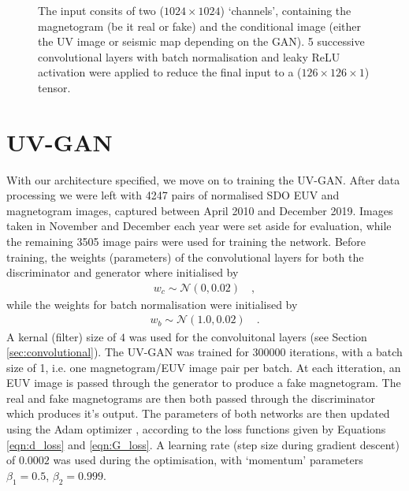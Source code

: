 \documentclass[11pt,a4paper,onecolumn]{report}
\begin{document}
\begin{figure}
  \centering
  \caption{
    The input consits of two ($1024\times 1024$) `channels', containing the
    magnetogram (be it real or fake) and the conditional image (either the UV
    image or seismic map depending on the GAN). 5 successive convolutional
    layers with batch normalisation and leaky ReLU activation were applied to
    reduce the final input to a ($126\times 126 \times 1$) tensor.
  }
  \label{fig:discrim_model}
\end{figure}



\section{UV-GAN}
With our architecture specified, we move on to training the UV-GAN. After data
processing we were left with 4247 pairs of normalised SDO EUV and magnetogram
images, captured between April 2010 and December 2019. Images taken in November
and December each year were set aside for evaluation, while the remaining 3505
image pairs were used for training the network. Before training, the weights
(parameters) of the convolutional layers for both the discriminator and
generator where initialised by
\begin{align}
  w_c \sim \mathcal{N}\left(0, 0.02\right) \quad ,
\end{align}
while the weights for batch normalisation were initialised by
\begin{align}
  w_b \sim \mathcal{N}\left(1.0, 0.02\right) \quad .
\end{align}
A kernal (filter) size of $4$ was used for the convoluitonal layers (see Section
\ref{sec:convolutional}). The UV-GAN was trained for $300000$ iterations, with a
batch size of 1, i.e. one magnetogram/EUV image pair per batch. At each
itteration, an EUV image is passed through the generator to produce a fake
magnetogram. The real and fake magnetograms are then both passed through the
discriminator which produces it's output. The parameters of both networks are
then updated using the Adam optimizer \citep{kingma_adam_2014}, according to the
loss functions given by Equations \ref{eqn:d_loss} and \ref{eqn:G_loss}. A
learning rate (step size during gradient descent) of $0.0002$ was used during
the optimisation, with `momentum' parameters $\beta_1 = 0.5$, $\beta_2 = 0.999$.\\
\end{document}

